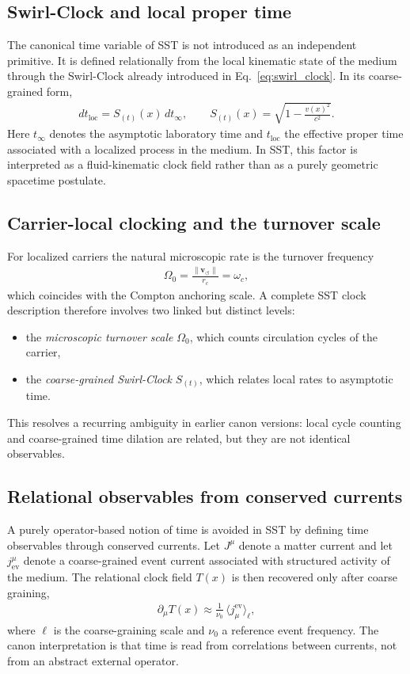 \documentclass[11pt]{article}
\theoremstyle{definition}
\theoremstyle{plain}
\theoremstyle{remark}
\newcommand{\rc}{{r_c}}
\newcommand{\vnorm}{\lVert \mathbf{v}_{\!\boldsymbol{\circlearrowleft}} \rVert}
\begin{document}
    \subsection{Swirl-Clock and local proper time}
        The canonical time variable of SST is not introduced as an independent primitive. It is defined relationally from the local kinematic state of the medium through the Swirl-Clock already introduced in Eq.~\eqref{eq:swirl_clock}. In its coarse-grained form,
        \begin{align}
            dt_{\mathrm{loc}} = S_{(t)}(x)\,dt_{\infty},
            \qquad
            S_{(t)}(x)=\sqrt{1-\frac{v(x)^2}{c^2}}.
        \end{align}
        Here $t_{\infty}$ denotes the asymptotic laboratory time and $t_{\mathrm{loc}}$ the effective proper time associated with a localized process in the medium. In SST, this factor is interpreted as a fluid-kinematic clock field rather than as a purely geometric spacetime postulate.

    \subsection{Carrier-local clocking and the turnover scale}
        For localized carriers the natural microscopic rate is the turnover frequency
        \begin{align}
            \Omega_0 = \frac{\vnorm}{\rc} = \omega_c,
        \end{align}
        which coincides with the Compton anchoring scale. A complete SST clock description therefore involves two linked but distinct levels:
        \begin{itemize}
            \item the \emph{microscopic turnover scale} $\Omega_0$, which counts circulation cycles of the carrier,
            \item the \emph{coarse-grained Swirl-Clock} $S_{(t)}$, which relates local rates to asymptotic time.
        \end{itemize}
        This resolves a recurring ambiguity in earlier canon versions: local cycle counting and coarse-grained time dilation are related, but they are not identical observables.

    \subsection{Relational observables from conserved currents}
        A purely operator-based notion of time is avoided in SST by defining time observables through conserved currents. Let $J^\mu$ denote a matter current and let $j_{\mathrm{ev}}^\mu$ denote a coarse-grained event current associated with structured activity of the medium. The relational clock field $T(x)$ is then recovered only after coarse graining,
        \begin{align}
            \partial_\mu T(x) \approx \frac{1}{\nu_0}\,\langle j^{\mathrm{ev}}_\mu \rangle_{\ell},
        \end{align}
        where $\ell$ is the coarse-graining scale and $\nu_0$ a reference event frequency. The canon interpretation is that time is read from correlations between currents, not from an abstract external operator.
\end{document}
